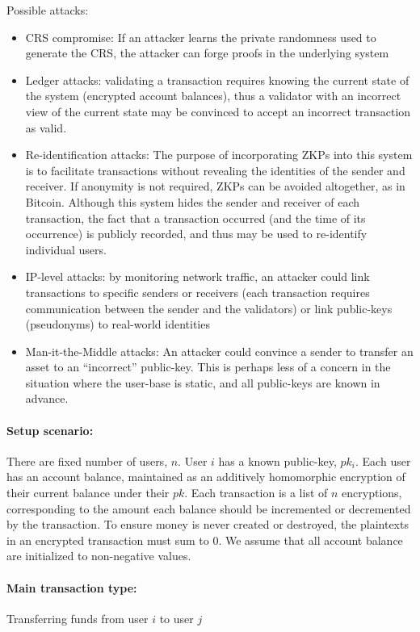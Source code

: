 Possible attacks:
	\begin{itemize}
    \item CRS compromise: If an attacker learns the private randomness used to generate the CRS, the attacker can forge proofs in the underlying system
    \item Ledger attacks: validating a transaction requires knowing the current state of the system (encrypted account balances), thus a validator with an incorrect view of the current state may be convinced to accept an incorrect transaction as valid.
    \item Re-identification attacks: The purpose of incorporating ZKPs into this system is to facilitate transactions without revealing the identities of the sender and receiver.  If anonymity is not required, ZKPs can be avoided altogether, as in Bitcoin.  Although this system hides the sender and receiver of each transaction, the fact that a transaction occurred (and the time of its occurrence) is publicly recorded, and thus may be used to re-identify individual users.
    \item IP-level attacks: by monitoring network traffic, an attacker could link transactions to specific senders or receivers (each transaction requires communication between the sender and the validators) or link public-keys (pseudonyms) to real-world identities
    \item Man-it-the-Middle attacks: An attacker could convince a sender to transfer an asset to an “incorrect” public-key.  This is perhaps less of a concern in the situation where the user-base is static, and all public-keys are known in advance.
	\end{itemize}


\paragraph{Setup scenario:} 
There are fixed number of users, $n$.  
User $i$ has a known public-key, $pk_i$.
Each user has an account balance, maintained as an additively homomorphic encryption of their current balance under their $pk$.
Each transaction is a list of $n$ encryptions, corresponding to the amount each balance should be incremented or decremented by the transaction.
To ensure money is never created or destroyed, the plaintexts in an encrypted transaction must sum to 0.
We assume that all account balance are initialized to non-negative values.


\paragraph{Main transaction type:} 
Transferring funds from user $i$ to user $j$


